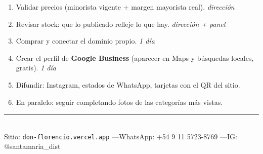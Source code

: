 \documentclass[a4paper,11pt]{article}
\begin{document}
\begin{enumerate}[leftmargin=1.4em, itemsep=2pt]
  \item Validar precios (minorista vigente + margen mayorista real). \hfill \textit{direcci\'on}
  \item Revisar stock: que lo publicado refleje lo que hay. \hfill \textit{direcci\'on + panel}
  \item Comprar y conectar el dominio propio. \hfill \textit{1 d\'ia}
  \item Crear el perfil de \textbf{Google Business} (aparecer en Maps y b\'usquedas locales, gratis). \hfill \textit{1 d\'ia}
  \item Difundir: Instagram, estados de WhatsApp, tarjetas con el QR del sitio.
  \item En paralelo: seguir completando fotos de las categor\'ias m\'as vistas.
\end{enumerate}

\vspace{1em}
\begin{center}
\color{vino}\rule{0.6\textwidth}{0.4pt}\\[6pt]
\small Sitio: \texttt{don-florencio.vercel.app} \quad---\quad WhatsApp: +54 9 11 5723-8769 \quad---\quad IG: @santamaria\_dist
\end{center}
\end{document}
